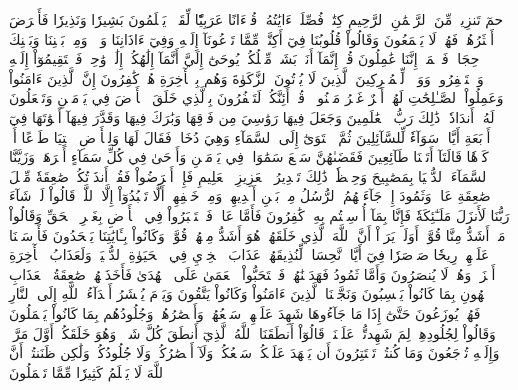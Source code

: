 حمٓ
تَنزِيلٞ مِّنَ ٱلرَّحۡمَٰنِ ٱلرَّحِيمِ
كِتَٰبٞ فُصِّلَتۡ ءَايَٰتُهُۥ قُرۡءَانًا عَرَبِيّٗا لِّقَوۡمٖ يَعۡلَمُونَ
بَشِيرٗا وَنَذِيرٗا فَأَعۡرَضَ أَكۡثَرُهُمۡ فَهُمۡ لَا يَسۡمَعُونَ
وَقَالُواْ قُلُوبُنَا فِيٓ أَكِنَّةٖ مِّمَّا تَدۡعُونَآ إِلَيۡهِ وَفِيٓ ءَاذَانِنَا وَقۡرٞ وَمِنۢ بَيۡنِنَا وَبَيۡنِكَ حِجَابٞ فَٱعۡمَلۡ إِنَّنَا عَٰمِلُونَ
قُلۡ إِنَّمَآ أَنَا۠ بَشَرٞ مِّثۡلُكُمۡ يُوحَىٰٓ إِلَيَّ أَنَّمَآ إِلَٰهُكُمۡ إِلَٰهٞ وَٰحِدٞ فَٱسۡتَقِيمُوٓاْ إِلَيۡهِ وَٱسۡتَغۡفِرُوهُۗ وَوَيۡلٞ لِّلۡمُشۡرِكِينَ
ٱلَّذِينَ لَا يُؤۡتُونَ ٱلزَّكَوٰةَ وَهُم بِٱلۡأٓخِرَةِ هُمۡ كَٰفِرُونَ
إِنَّ ٱلَّذِينَ ءَامَنُواْ وَعَمِلُواْ ٱلصَّـٰلِحَٰتِ لَهُمۡ أَجۡرٌ غَيۡرُ مَمۡنُونٖ
۞قُلۡ أَئِنَّكُمۡ لَتَكۡفُرُونَ بِٱلَّذِي خَلَقَ ٱلۡأَرۡضَ فِي يَوۡمَيۡنِ وَتَجۡعَلُونَ لَهُۥٓ أَندَادٗاۚ ذَٰلِكَ رَبُّ ٱلۡعَٰلَمِينَ
وَجَعَلَ فِيهَا رَوَٰسِيَ مِن فَوۡقِهَا وَبَٰرَكَ فِيهَا وَقَدَّرَ فِيهَآ أَقۡوَٰتَهَا فِيٓ أَرۡبَعَةِ أَيَّامٖ سَوَآءٗ لِّلسَّآئِلِينَ
ثُمَّ ٱسۡتَوَىٰٓ إِلَى ٱلسَّمَآءِ وَهِيَ دُخَانٞ فَقَالَ لَهَا وَلِلۡأَرۡضِ ٱئۡتِيَا طَوۡعًا أَوۡ كَرۡهٗا قَالَتَآ أَتَيۡنَا طَآئِعِينَ
فَقَضَىٰهُنَّ سَبۡعَ سَمَٰوَاتٖ فِي يَوۡمَيۡنِ وَأَوۡحَىٰ فِي كُلِّ سَمَآءٍ أَمۡرَهَاۚ وَزَيَّنَّا ٱلسَّمَآءَ ٱلدُّنۡيَا بِمَصَٰبِيحَ وَحِفۡظٗاۚ ذَٰلِكَ تَقۡدِيرُ ٱلۡعَزِيزِ ٱلۡعَلِيمِ
فَإِنۡ أَعۡرَضُواْ فَقُلۡ أَنذَرۡتُكُمۡ صَٰعِقَةٗ مِّثۡلَ صَٰعِقَةِ عَادٖ وَثَمُودَ
إِذۡ جَآءَتۡهُمُ ٱلرُّسُلُ مِنۢ بَيۡنِ أَيۡدِيهِمۡ وَمِنۡ خَلۡفِهِمۡ أَلَّا تَعۡبُدُوٓاْ إِلَّا ٱللَّهَۖ قَالُواْ لَوۡ شَآءَ رَبُّنَا لَأَنزَلَ مَلَـٰٓئِكَةٗ فَإِنَّا بِمَآ أُرۡسِلۡتُم بِهِۦ كَٰفِرُونَ
فَأَمَّا عَادٞ فَٱسۡتَكۡبَرُواْ فِي ٱلۡأَرۡضِ بِغَيۡرِ ٱلۡحَقِّ وَقَالُواْ مَنۡ أَشَدُّ مِنَّا قُوَّةًۖ أَوَلَمۡ يَرَوۡاْ أَنَّ ٱللَّهَ ٱلَّذِي خَلَقَهُمۡ هُوَ أَشَدُّ مِنۡهُمۡ قُوَّةٗۖ وَكَانُواْ بِـَٔايَٰتِنَا يَجۡحَدُونَ
فَأَرۡسَلۡنَا عَلَيۡهِمۡ رِيحٗا صَرۡصَرٗا فِيٓ أَيَّامٖ نَّحِسَاتٖ لِّنُذِيقَهُمۡ عَذَابَ ٱلۡخِزۡيِ فِي ٱلۡحَيَوٰةِ ٱلدُّنۡيَاۖ وَلَعَذَابُ ٱلۡأٓخِرَةِ أَخۡزَىٰۖ وَهُمۡ لَا يُنصَرُونَ
وَأَمَّا ثَمُودُ فَهَدَيۡنَٰهُمۡ فَٱسۡتَحَبُّواْ ٱلۡعَمَىٰ عَلَى ٱلۡهُدَىٰ فَأَخَذَتۡهُمۡ صَٰعِقَةُ ٱلۡعَذَابِ ٱلۡهُونِ بِمَا كَانُواْ يَكۡسِبُونَ
وَنَجَّيۡنَا ٱلَّذِينَ ءَامَنُواْ وَكَانُواْ يَتَّقُونَ
وَيَوۡمَ يُحۡشَرُ أَعۡدَآءُ ٱللَّهِ إِلَى ٱلنَّارِ فَهُمۡ يُوزَعُونَ
حَتَّىٰٓ إِذَا مَا جَآءُوهَا شَهِدَ عَلَيۡهِمۡ سَمۡعُهُمۡ وَأَبۡصَٰرُهُمۡ وَجُلُودُهُم بِمَا كَانُواْ يَعۡمَلُونَ
وَقَالُواْ لِجُلُودِهِمۡ لِمَ شَهِدتُّمۡ عَلَيۡنَاۖ قَالُوٓاْ أَنطَقَنَا ٱللَّهُ ٱلَّذِيٓ أَنطَقَ كُلَّ شَيۡءٖۚ وَهُوَ خَلَقَكُمۡ أَوَّلَ مَرَّةٖ وَإِلَيۡهِ تُرۡجَعُونَ
وَمَا كُنتُمۡ تَسۡتَتِرُونَ أَن يَشۡهَدَ عَلَيۡكُمۡ سَمۡعُكُمۡ وَلَآ أَبۡصَٰرُكُمۡ وَلَا جُلُودُكُمۡ وَلَٰكِن ظَنَنتُمۡ أَنَّ ٱللَّهَ لَا يَعۡلَمُ كَثِيرٗا مِّمَّا تَعۡمَلُونَ
